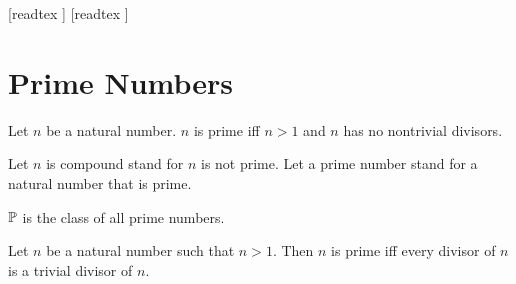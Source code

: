 \documentclass[10pt]{article}
\begin{document}
  \begin{imports}
    \begin{forthel}
      [readtex ]
      [readtex ]
    \end{forthel}
  \end{imports}


  \section*{Prime Numbers}

  \begin{forthel}
    \begin{definition}
      Let $n$ be a natural number.
      $n$ is prime iff $n > 1$ and $n$ has no nontrivial divisors.
    \end{definition}

    Let $n$ is compound stand for $n$ is not prime.
    Let a prime number stand for a natural number that is prime.
  \end{forthel}

  \begin{forthel}
    \begin{definition}
      $\mathbb{P}$ is the class of all prime numbers.
    \end{definition}
  \end{forthel}

  \begin{forthel}
    \begin{proposition}
      Let $n$ be a natural number such that $n > 1$.
      Then $n$ is prime iff every divisor of $n$ is a trivial divisor of $n$.
    \end{proposition}
  \end{forthel}
\end{document}
